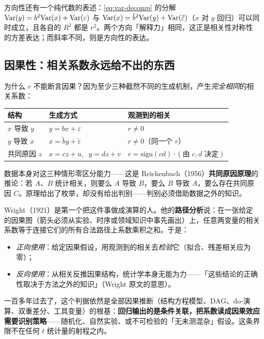 方向性还有一个纯代数的表述：\eqref{eq:var-decomp} 的分解 $\mathrm{Var}(y) = b^2\mathrm{Var}(x) + \mathrm{Var}(\varepsilon)$ 与 $\mathrm{Var}(x) = \tilde{b}^2 \mathrm{Var}(y) + \mathrm{Var}(\tilde\varepsilon)$（$x$ 对 $y$ 回归）可以同时成立，且各自的 $R^2$ 都是 $r^2$。两个方向「解释力」相同，这正是相关性对称性的方差表达；而斜率不同，则是方向性的表达。

\subsection{因果性：相关系数永远给不出的东西}\label{sec:1d-causality}

为什么 $r$ 不能断言因果？因为至少三种截然不同的生成机制，产生\textit{完全相同}的相关系数：

\begin{center}
\begin{tabular}{@{}lll@{}}
\toprule
结构 & 生成方式 & 观测到的相关 \\
\midrule
$x$ 导致 $y$ & $y = bx + \varepsilon$ & $r \neq 0$ \\
$y$ 导致 $x$ & $x = \tilde{b} y + \tilde\varepsilon$ & $r \neq 0$（同一个 $r$） \\
共同原因 $z$ & $x = c z + u,\;\; y = d z + v$ & $r = \mathrm{sign}(cd)\cdot(\text{由 } c,d \text{ 决定})$ \\
\bottomrule
\end{tabular}
\end{center}

数据本身对这三种情形零区分能力——这是 Reichenbach（1956）\textbf{共同原因原理}的推论：若 $A$、$B$ 统计相关，则要么 $A$ 导致 $B$，要么 $B$ 导致 $A$，要么存在共同原因 $C$\cite{reichenbach1956}。原理给出了枚举，却没有给出判别——判别必须借助数据之外的知识。

Wright（1921）是第一个把这件事做成演算的人\cite{wright1921}。他的\textbf{路径分析}说：在一张给定的因果图（箭头必须从实验、时序或领域知识中事先画出）上，任意两变量的相关系数等于连接它们的所有合法路径上系数乘积之和。于是：
\begin{itemize}
  \item \textit{正向使用}：给定因果假设，用观测到的相关去\textit{检验}它（拟合、残差相关应为零）；
  \item \textit{反向使用}：从相关反推因果结构，统计学本身无能为力——「这些结论的正确性取决于方法之外的知识」（Wright 原文的意思\cite{wright1921}）。
\end{itemize}

一百多年过去了，这个判据依然是全部因果推断（结构方程模型、DAG、do-演算、双重差分、工具变量）的根基：\textbf{回归输出的是条件关联，把系数读成因果效应需要识别策略}——随机化、自然实验、或不可检验的「无未测混杂」假设。这条界限不在任何 $t$ 统计量的射程之内。

